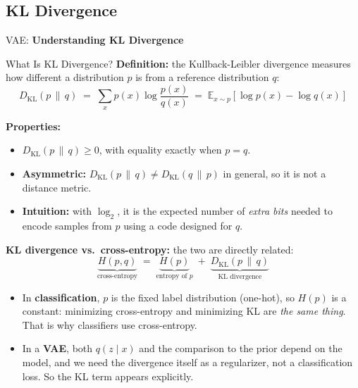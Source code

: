 \subsection{KL Divergence}
\begin{frame}{}
	\LARGE VAE: \textbf{Understanding KL Divergence}
\end{frame}

\begin{frame}[allowframebreaks]{What Is KL Divergence?}
\textbf{Definition:} the Kullback-Leibler divergence measures how different a distribution $p$ is from a reference distribution $q$:
\[
D_{\mathrm{KL}}(p \,\|\, q) \;=\; \sum_x p(x) \log \frac{p(x)}{q(x)} \;=\; \mathbb{E}_{x \sim p}\!\left[ \log p(x) - \log q(x) \right]
\]

\textbf{Properties:}
\begin{itemize}
    \item $D_{\mathrm{KL}}(p \,\|\, q) \geq 0$, with equality exactly when $p = q$.
    \item \textbf{Asymmetric:} $D_{\mathrm{KL}}(p \,\|\, q) \neq D_{\mathrm{KL}}(q \,\|\, p)$ in general, so it is not a distance metric.
    \item \textbf{Intuition:} with $\log_2$, it is the expected number of \emph{extra bits} needed to encode samples from $p$ using a code designed for $q$.
\end{itemize}

\framebreak

\textbf{KL divergence vs.\ cross-entropy:} the two are directly related:
\[
\underbrace{H(p, q)}_{\text{cross-entropy}} \;=\; \underbrace{H(p)}_{\text{entropy of } p} \;+\; \underbrace{D_{\mathrm{KL}}(p \,\|\, q)}_{\text{KL divergence}}
\]
\begin{itemize}
    \item In \textbf{classification}, $p$ is the fixed label distribution (one-hot), so $H(p)$ is a constant: minimizing cross-entropy and minimizing KL are \emph{the same thing}. That is why classifiers use cross-entropy.
    \item In a \textbf{VAE}, both $q(z \mid x)$ and the comparison to the prior depend on the model, and we need the divergence itself as a regularizer, not a classification loss. So the KL term appears explicitly.
\end{itemize}

\framebreak


\end{frame}
